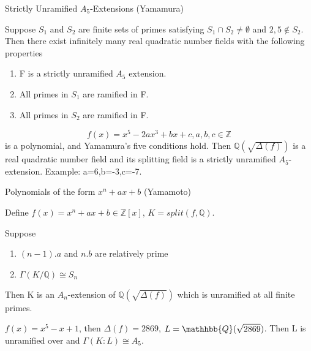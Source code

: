 \documentclass[10pt]{beamer}
\newcommand{\q}{\mathbb{Q}}
\newcommand{\lb}{\left(}
\newcommand{\rb}{\right)}å
\theoremstyle{plain} %
\begin{document}
\begin{frame}{Strictly Unramified $A_5$-Extensions (Yamamura)}
\pause

    \begin{theorem}
    Suppose $S_1$ and $S_2$ are finite sets of primes satisfying $S_1 \cap S_2 \neq \emptyset$ and $2,5 \notin S_2$. Then there exist infinitely many real quadratic number fields with the following properties \begin{enumerate}
        \item F is a strictly unramified $A_5$ extension.
        \item All primes in $S_1$ are ramified in F.
        \item All primes in $S_2$ are ramified in F.
    \end{enumerate}
\end{theorem}
\pause

\begin{example}
\begin{equation}
    f(x)=x^5-2ax^3+bx+c, a,b,c \in \mathbb{Z}
\end{equation} is a polynomial, and Yamamura's five conditions hold. Then $\q\lb\sqrt{\Delta\lb f\rb}\rb$ is a real quadratic number field and its splitting field is a strictly unramified $A_5$-extension. Example: a=6,b=-3,c=-7.
\end{example}
\end{frame}
\begin{frame}{Polynomials of the form $x^n+ax+b$ (Yamamoto)}
\pause

Define $ f(x) = x^n+ax+b \in \mathbb{Z}[x]$,
$K=split(f,\mathbb{Q})$. 
\pause

Suppose
\begin{enumerate}
    \item $(n-1).a$ and $n.b$ are relatively prime 
    \item $\Gamma(K/\mathbb{Q}) \cong S_n$
\end{enumerate}\par
\pause

Then K is an $A_n$-extension of $\mathbb{Q}(\sqrt{\Delta(f)})$ which is unramified at all finite primes. 
\pause

\begin{example}
$f(x) = x^5-x+1$, then $\Delta(f)= 2869$, $L = \mathhbb{Q}(\sqrt{2869})$. Then L is unramified over  and $\Gamma(K:L)\cong A_5.$
\end{example}  
\end{frame}
\end{document}
